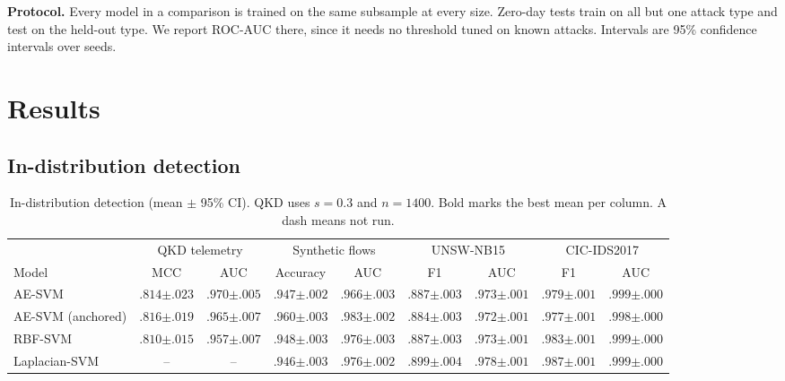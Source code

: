 \documentclass[journal]{IEEEtran}
\begin{document}
\textbf{Protocol.} Every model in a comparison is trained on the same subsample at
every size. Zero-day tests train on all but one attack type and test on the held-out
type. We report ROC-AUC there, since it needs no threshold tuned on known attacks.
Intervals are 95\% confidence intervals over seeds.

\section{Results}
\label{sec:results}

\subsection{In-distribution detection}
\label{sec:res-indist}

\begin{table}[t]
  \centering
  \caption{In-distribution detection (mean $\pm$ 95\% CI). QKD uses $s=0.3$ and $n=1400$. Bold marks the best mean per column. A dash means not run.}
  \label{tab:indist}
  \scriptsize
  \setlength{\tabcolsep}{3.2pt}
  \begin{tabular}{lcccccccc}
    \toprule
    & \multicolumn{2}{c}{QKD telemetry} & \multicolumn{2}{c}{Synthetic flows} & \multicolumn{2}{c}{UNSW-NB15} & \multicolumn{2}{c}{CIC-IDS2017} \\
    \cmidrule(lr){2-3}\cmidrule(lr){4-5}\cmidrule(lr){6-7}\cmidrule(lr){8-9}
    Model & MCC & AUC & Accuracy & AUC & F1 & AUC & F1 & AUC \\
    \midrule
    AE-SVM & $.814{\scriptstyle\pm.023}$ & $\mathbf{.970{\scriptstyle\pm.005}}$ & $.947{\scriptstyle\pm.002}$ & $.966{\scriptstyle\pm.003}$ & $.887{\scriptstyle\pm.003}$ & $.973{\scriptstyle\pm.001}$ & $.979{\scriptstyle\pm.001}$ & $.999{\scriptstyle\pm.000}$ \\
    AE-SVM (anchored) & $.816{\scriptstyle\pm.019}$ & $.965{\scriptstyle\pm.007}$ & $.960{\scriptstyle\pm.003}$ & $.983{\scriptstyle\pm.002}$ & $.884{\scriptstyle\pm.003}$ & $.972{\scriptstyle\pm.001}$ & $.977{\scriptstyle\pm.001}$ & $.998{\scriptstyle\pm.000}$ \\
    RBF-SVM & $.810{\scriptstyle\pm.015}$ & $.957{\scriptstyle\pm.007}$ & $.948{\scriptstyle\pm.003}$ & $.976{\scriptstyle\pm.003}$ & $.887{\scriptstyle\pm.003}$ & $.973{\scriptstyle\pm.001}$ & $.983{\scriptstyle\pm.001}$ & $.999{\scriptstyle\pm.000}$ \\
    Laplacian-SVM & -- & -- & $.946{\scriptstyle\pm.003}$ & $.976{\scriptstyle\pm.002}$ & $.899{\scriptstyle\pm.004}$ & $.978{\scriptstyle\pm.001}$ & $.987{\scriptstyle\pm.001}$ & $\mathbf{.999{\scriptstyle\pm.000}}$ \\

\end{tabular}
\end{table}
\end{document}
